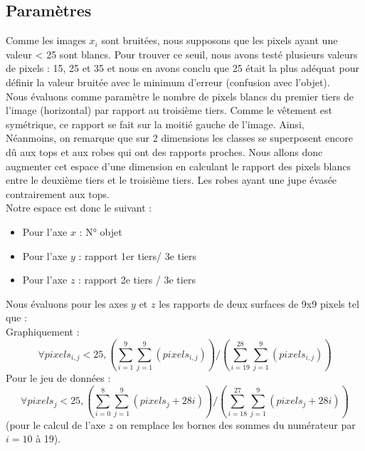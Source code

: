 \documentclass[a4paper,10pt]{article}
\begin{document}
	\subsection{Paramètres}
		Comme les images $x_i$ sont bruitées, nous supposons que les pixels ayant une valeur < 25 sont blancs.
		Pour trouver ce seuil, nous avons testé plusieurs valeurs de pixels : 15, 25 et 35 et nous en avons conclu que 25 était la plus adéquat pour définir la valeur bruitée avec le minimum d'erreur (confusion avec l'objet).\\
		Nous évaluons comme paramètre le nombre de pixels blancs du premier tiers de l'image (horizontal) par rapport au troisième tiers. Comme le vêtement est symétrique, ce rapport se fait sur la moitié gauche de l'image. Ainsi, \\
		Néanmoins, on remarque que sur 2 dimensions les classes se superposent encore dû aux tops et aux robes qui ont des rapports proches. Nous allons donc augmenter cet espace d'une dimension en calculant le rapport des pixels blancs entre le deuxième tiers et le troisième tiers. Les robes ayant une jupe évasée contrairement aux tops. \\
		Notre espace est donc le suivant :
		\begin{itemize}
			\item Pour l'axe $x$ : N° objet
			\item Pour l'axe $y$ : rapport 1er tiers/ 3e tiers
			\item Pour l'axe $z$ : rapport 2e tiers / 3e tiers
		\end{itemize}
		Nous évaluons pour les axes $y$ et $z$ les rapports de deux surfaces de 9x9 pixels tel que : \\
		Graphiquement :
		$$ \forall pixels_{i,j} < 25,  (\sum_{i=1} ^9 \sum_{j=1} ^9  (pixels_{i,j})) / (\sum_{i=19} ^{28} \sum_{j=1}^9  (pixels_{i,j}) ) $$
		Pour le jeu de données :
		$$ \forall pixels_j < 25, (\sum_{i=0} ^8 \sum_{j=1} ^9  (pixels_j +28i) ) / (\sum_{i=18} ^{27} \sum_{j=1} ^9  (pixels_j+28i) ) $$
		(pour le calcul de l'axe $z$ on remplace les bornes des sommes du numérateur par $i=10$ à 19).
\end{document}
